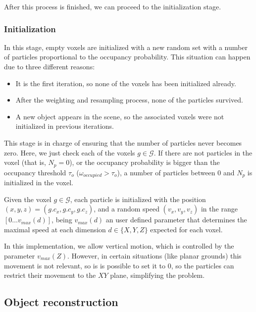 After this process is finished, we can proceed to the initialization stage.

\subsubsection{Initialization}\label{ch:chapter05_01_04_03}

In this stage, empty voxels are initialized with a new random set with a number of particles proportional to the occupancy probability. This situation can happen due to three different reasons:
\begin{itemize}
 \item It is the first iteration, so none of the voxels has been initialized already.
 \item After the weighting and resampling process, none of the particles survived.
 \item A new object appears in the scene, so the associated voxels were not initialized in previous iterations.
\end{itemize}

This stage is in charge of ensuring that the number of particles never becomes zero. Here, we just check each of the voxels $g \in \mathcal{G}$. If there are not particles in the voxel (that is, $N_p = 0$), or the occupancy probability is bigger than the occupancy threshold $\tau_{o}$ ($\omega_{occupied} > \tau_{o}$), a number of particles between 0 and $N_p$ is initialized in the voxel.

Given the voxel $g \in \mathcal{G}$, each particle is initialized with the position $(x, y, z) = (g.c_x, g.c_y, g.c_z)$, and a random speed $(v_x, v_y, v_z)$ in the range $[0\dots v_{max}(d)]$, being $v_{max}(d)$ an user defined parameter that determines the maximal speed at each dimension $d \in \{ X, Y, Z\}$ expected for each voxel. 

In this implementation, we allow vertical motion, which is controlled by the parameter $v_{max}(Z)$. However, in certain situations (like planar grounds) this movement is not relevant, so is is possible to set it to $0$, so the particles can restrict their movement to the $XY$ plane, simplifying the problem.

\FloatBarrier

\subsection{Object reconstruction}\label{ch:chapter05_01_05}

